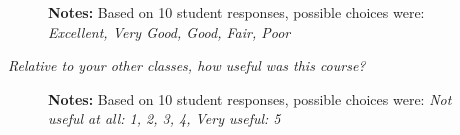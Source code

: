 \begin{boenumerate}
\begin{figure}[h!]\centering
{}\hspace{0.75cm}
\begin{center}
\begin{minipage}[t]{0.85\columnwidth}\vspace{-0.75cm}
\item\scriptsize{\textbf{Notes:} Based on 10 student responses, possible choices were: \emph{Excellent, Very Good, Good, Fair, Poor}}
\end{minipage}
\end{center}
\end{figure}
\newpage
\item \textit{Relative to your other classes, how useful was this course?}

\begin{figure}[h!]\centering
{}\hspace{0.75cm}
\begin{center}
\begin{minipage}[t]{0.85\columnwidth}\vspace{-0.75cm}
\item\scriptsize{\textbf{Notes:} Based on 10 student responses, possible choices were: \emph{Not useful at all: 1, 2, 3, 4, Very useful: 5}}
\end{minipage}
\end{center}
\end{figure}


\end{boenumerate}
